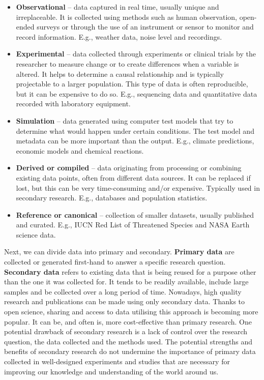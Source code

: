 \documentclass[
]{book}
\begin{document}
\begin{itemize}
\item
  \textbf{Observational} -- data captured in real time, usually unique and irreplaceable. It is collected using methods such as human observation, open-ended surveys or through the use of an instrument or sensor to monitor and record information. E.g., weather data, noise level and recordings.
\item
  \textbf{Experimental} -- data collected through experiments or clinical trials by the researcher to measure change or to create differences when a variable is altered. It helps to determine a causal relationship and is typically projectable to a larger population. This type of data is often reproducible, but it can be expensive to do so. E.g., sequencing data and quantitative data recorded with laboratory equipment.
\item
  \textbf{Simulation} -- data generated using computer test models that try to determine what would happen under certain conditions. The test model and metadata can be more important than the output. E.g., climate predictions, economic models and chemical reactions.
\item
  \textbf{Derived or compiled} -- data originating from processing or combining existing data points, often from different data sources. It can be replaced if lost, but this can be very time-consuming and/or expensive. Typically used in secondary research. E.g., databases and population statistics.
\item
  \textbf{Reference or canonical} -- collection of smaller datasets, usually published and curated. E.g., IUCN Red List of Threatened Species and NASA Earth science data.
\end{itemize}

Next, we can divide data into primary and secondary. \textbf{Primary data} are collected or generated first-hand to answer a specific research question. \textbf{Secondary data} refers to existing data that is being reused for a purpose other than the one it was collected for. It tends to be readily available, include large samples and be collected over a long period of time. Nowadays, high quality research and publications can be made using only secondary data. Thanks to open science, sharing and access to data utilising this approach is becoming more popular. It can be, and often is, more cost-effective than primary research. One potential drawback of secondary research is a lack of control over the research question, the data collected and the methods used. The potential strengths and benefits of secondary research do not undermine the importance of primary data collected in well-designed experiments and studies that are necessary for improving our knowledge and understanding of the world around us.
\end{document}
